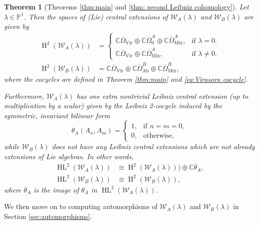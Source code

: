 \documentclass[11pt, svgnames]{amsart}
\DeclareMathOperator{\Vir}{Vir}
\newcommand{\CC}{\mathbb{C}}
\newcommand{\PP}{\mathbb{P}}
\newcommand{\W}{\mathcal{W}}
\DeclareMathOperator{\HH}{H}
\DeclareMathOperator{\HL}{HL}
\DeclareMathOperator{\Ab}{Ab}
\DeclareMathOperator{\Mix}{Mix}
\newtheorem{theorem}[proposition]{Theorem}
\theoremstyle{definition}
\begin{document}
\begin{theorem}[Theorems \ref{thm:main} and \ref{thm: second Leibniz cohomology}]\label{thm:intro central extensions}
    Let $\lambda \in \PP^1$. Then the spaces of (Lie) central extensions of $\W_A(\lambda)$ and $\W_B(\lambda)$ are given by
    \begin{align*}
        \HH^2(\W_A(\lambda)) &=
        \begin{cases}
            \CC \overline{\Omega}_{\Vir} \oplus \CC \overline{\Omega}_0^A \oplus \CC \overline{\Omega}_{\Mix}^A, &\text{if } \lambda=0.\\
            \CC \overline{\Omega}_{\Vir} \oplus \CC \overline{\Omega}_{\Mix}^A, &\text{if } \lambda \neq 0.
        \end{cases} \\
        \HH^2(\W_B(\lambda)) &= \CC \overline{\Omega}_{\Vir} \oplus \CC \overline{\Omega}_{\Ab}^B \oplus \CC \overline{\Omega}_{\Mix}^B,
    \end{align*}
    where the cocycles are defined in Theorem \ref{thm:main} and \eqref{eq:Virasoro cocycle}.

    Furthermore, $\W_A(\lambda)$ has one extra nontrivial Leibniz central extension (up to multiplication by a scalar) given by the Leibniz 2-cocycle induced by the symmetric, invariant bilinear form
    $$\theta_A(A_n,A_m) = \begin{cases}
        1, &\text{if } n = m = 0, \\
        0, &\text{otherwise},
    \end{cases}$$
    while $\W_B(\lambda)$ does not have any Leibniz central extensions which are not already extensions of Lie algebras. In other words,
    \begin{align*}
        \HL^2(\W_A(\lambda)) &\cong \HH^2(\W_A(\lambda))) \oplus \CC \overline{\theta}_A, \\
        \HL^2(\W_B(\lambda)) &\cong \HH^2(\W_B(\lambda)),
    \end{align*}
    where $\overline{\theta}_A$ is the image of $\theta_A$ in $\HL^2(\W_A(\lambda))$.
\end{theorem}

We then move on to computing automorphisms of $\W_A(\lambda)$ and $\W_B(\lambda)$ in Section \ref{sec:automorphisms}.
\end{document}
